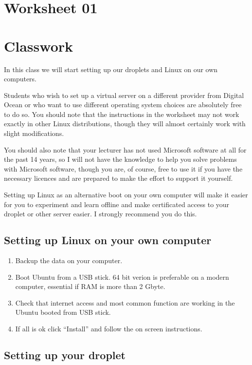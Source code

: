 \documentclass[12pt,a4paper]{article}
\begin{document}
\section*{Worksheet 01}
\section*{Classwork}
In this class we will start setting up our droplets and Linux on our own 
computers.

Students who wish to set up a virtual server on a different provider from 
Digital Ocean or who want to use different operating system choices are 
absolutely free to do so. You should note that the instructions in the worksheet may not work exactly in other Linux distributions, though they will almost certainly work with slight modifications.

You should also note that your lecturer has not used Microsoft software at all for the past 14 years, so I will not have the knowledge to help you solve problems with Microsoft software, though you are, of course, free to use it if you have the necessary licences and are prepared to make the effort to support it yourself. 

Setting up Linux as an alternative boot on your own computer will make it easier for you to experiment and learn offline and make certificated access to your droplet or other server easier. I strongly recommend you do this. 

\subsection*{Setting up Linux on your own computer}
\begin{enumerate}
 \item Backup the data on your computer.
 \item Boot Ubuntu from a USB stick. 64 bit verion is preferable on a modern computer,
  essential if RAM is more than 2 Gbyte.
 \item Check that internet access and most common function are working in the Ubuntu booted from USB stick.
 \item If all is ok click ``Install'' and follow the on screen instructions.
\end{enumerate}

\subsection*{Setting up your droplet}
\end{document}
